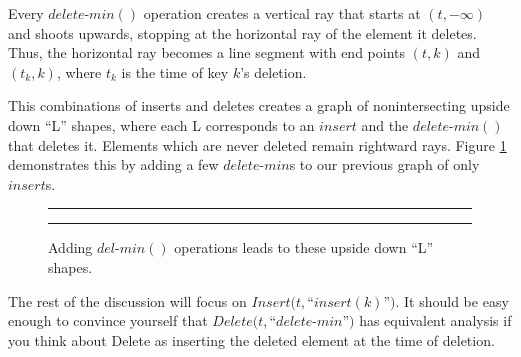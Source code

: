 \documentclass[11pt]{article}
\begin{document}
Every $delete$-$min()$ operation creates a vertical ray that starts at $(t,-\infty)$ and shoots upwards, stopping at the horizontal ray of the element it deletes. Thus, the horizontal ray becomes a line segment with end points $(t,k)$ and $(t_k,k)$, where $t_k$ is the time of key $k$'s deletion.

This combinations of inserts and deletes creates a graph of nonintersecting upside down ``L'' shapes, where each L corresponds to an $insert$ and the $delete$-$min()$ that deletes it.  Elements which are never deleted remain rightward rays. Figure \ref{fig-pqdel} demonstrates this by adding a few $delete$-$min$s to our previous graph of only $insert$s.

\begin{figure}[ht]
	\rule{\textwidth}{0.005in}
  \begin{center}
  \end{center}

  \caption{\small Adding $del$-$min()$ operations leads to these upside down ``L'' shapes.}
  \label{fig-pqdel}
	\rule{\textwidth}{0.005in}
\end{figure}

The rest of the discussion will focus on $Insert(t,$``$insert(k)$''$)$.  It should be easy enough to convince yourself that $Delete(t,$``$delete$-$min$''$)$ has equivalent analysis if you think about Delete as inserting the deleted element at the time of deletion. 
\end{document}
